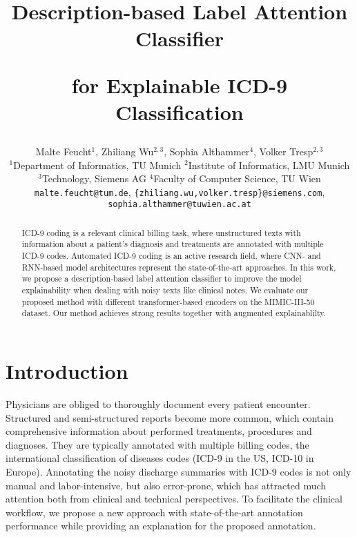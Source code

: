 \documentclass[11pt]{article}
\title{Description-based Label Attention Classifier 

for Explainable ICD-9 Classification}
\author{Malte Feucht$^{1}$, Zhiliang Wu$^{2,3}$, Sophia Althammer$^{4}$, Volker Tresp$^{2,3}$\\
  $^{1}$Department of Informatics, TU Munich
  $^{2}$Institute of Informatics, LMU Munich \\
  $^{3}$Technology, Siemens AG
  $^{4}$Faculty of Computer Science, TU Wien \\
  \texttt{malte.feucht@tum.de},
  \texttt{\{zhiliang.wu,volker.tresp\}@siemens.com},\\
  \texttt{sophia.althammer@tuwien.ac.at}\\}
\begin{document}
\maketitle
\begin{abstract}
ICD-9 coding is a relevant clinical billing task, where unstructured texts with information about a patient's diagnosis and treatments are annotated with multiple ICD-9 codes. Automated ICD-9 coding is an active research field, where CNN- and RNN-based model architectures represent the state-of-the-art approaches. In this work, we propose a description-based label attention classifier to improve the model explainability when dealing with noisy texts like clinical notes. 
We evaluate our proposed method with different transformer-based encoders on the MIMIC-III-50 dataset. Our method achieves strong results together with augmented explainablilty.
\end{abstract}

\section{Introduction}
Physicians are obliged to thoroughly document every patient encounter. Structured and semi-structured reports become more common, which contain comprehensive information about performed treatments, procedures and diagnoses. They are typically annotated with multiple billing codes, the international classification of diseases codes (ICD-9 in the US, ICD-10 in Europe). Annotating the noisy discharge summaries with ICD-9 codes is not only manual and labor-intensive, but also error-prone, which has attracted much attention both from clinical and technical perspectives. To facilitate the clinical workflow, we propose a new approach with state-of-the-art annotation performance while providing an explanation for the proposed annotation. 
\end{document}
